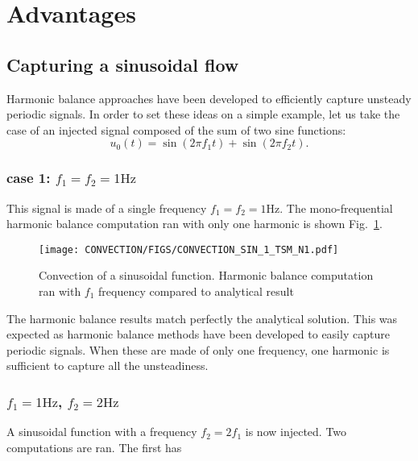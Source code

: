 \section{Advantages} %
\label{sec:advantages}

\subsection{Capturing a sinusoidal flow} %
\label{sub:capturing_a_sinusoidal_flow}

Harmonic balance approaches have been developed to
efficiently capture unsteady periodic signals.
In order to set these ideas on a simple example,
let us take the case of an injected signal composed
of the sum of two sine functions: 
\begin{equation}
	u_0(t) = \sin (2 \pi f_1 t) + \sin(2 \pi f_2 t).
\end{equation}




\subsubsection{case 1: $f_1 = f_2 = 1 \text{Hz}$}

This signal is made of a single frequency $f_1 = f_2 = 1 \text{Hz}$.
The mono-frequential harmonic balance computation ran with only one harmonic
is shown Fig.~\ref{fig:convection_sin_1_tsm_n_1}.
\begin{figure}[htbp]
  \begin{center}
    \texttt{[image: CONVECTION/FIGS/CONVECTION\_SIN\_1\_TSM\_N1.pdf]}
  \end{center}
  \caption{Convection of a sinusoidal function. Harmonic balance computation
  ran with $f_1$ frequency compared to analytical result}
  \label{fig:convection_sin_1_tsm_n_1}
\end{figure}
The harmonic balance results match perfectly the analytical solution.
This was expected as harmonic balance methods have been developed to
easily capture periodic signals. When these are made of only one frequency,
one harmonic is sufficient to capture all the unsteadiness.

\subsubsection{$f_1 = 1 \text{Hz}$, $f_2 = 2 \text{Hz}$}

A sinusoidal function with a frequency $f_2 = 2f_1$ is now injected.
Two computations are ran. The first has 

